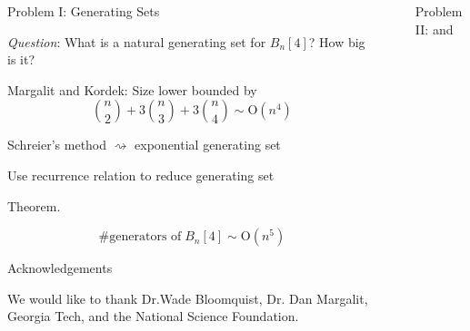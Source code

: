 \documentclass[final]{beamer}
\newlength{\sepwidth}
\newlength{\colwidth}
\newcommand{\separatorcolumn}{\begin{column}{\sepwidth}\end{column}}
\begin{document}
\begin{frame}[t]
\begin{columns}[t]
\begin{column}{\colwidth}
\begin{block}
  {\begin{huge}
    \vspace*{5mm} Problem I: Generating Sets
  \end{huge}} \begin{huge} 
  
 \vspace*{5mm} \emph{Question}: What is a natural generating set for $B_n[4]$? How big is it?
\end{huge} 

\begin{huge}

Margalit and Kordek: Size lower bounded by 
  $${n\choose 2}+3{n\choose 3}+3{n\choose 4}\sim \text{O}(n^4)$$
 
 \end{huge}


\begin{huge}

Schreier's method $\rightsquigarrow$ exponential generating set
 
Use recurrence relation to reduce generating set


\vspace*{-1mm}
{\bf {\begin{huge} Theorem. \end{huge}}}  \begin{Huge}
$${ \text{\# generators of} \; B_n[4]\sim \text{O}(n^5)}$$
\end{Huge}
  


\end{huge}
\end{block} 

\begin{block}{\begin{huge} Acknowledgements \end{huge}}

\begin{huge}
 We would like to thank Dr.\@ Wade Bloomquist, Dr. Dan Margalit, Georgia Tech, and the National Science Foundation.
 \end{huge}
  \end{block}
\end{column}


  \separatorcolumn

\begin{column}{\colwidth}

 \vspace*{-3mm} \begin{block}{
  \begin{huge}
    Problem II:  and 
  \end{huge}} 


\end{block}
\end{column}
\end{columns}
\end{frame}
\end{document}
